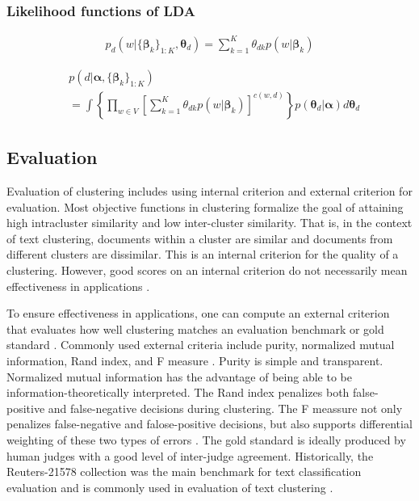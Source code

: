\documentclass{article}
\begin{document}
\subsubsection{Likelihood functions of LDA}

\begin{align}
  p_d(w | \{\boldsymbol{\beta}_k\}_{1:K}, \boldsymbol{\theta}_d) = \sum_{k = 1}^K \theta_{dk} p(w | \boldsymbol{\beta}_k)
\end{align}

\begin{align}
  & p(d | \boldsymbol{\alpha}, \{\boldsymbol{\beta}_k\}_{1:K}) \\
  & = \int \left\{ \prod_{w \in V} \left[ \sum_{k = 1}^K \theta_{dk} p(w | \boldsymbol{\beta}_k) \right]^{c(w,d)} \right\} p(\boldsymbol{\theta}_d | \boldsymbol{\alpha}) d\boldsymbol{\theta}_d
\end{align}


\subsection{Evaluation}

Evaluation of clustering includes using internal criterion and external criterion for evaluation. Most objective functions in clustering formalize the goal of attaining high intracluster similarity and low inter-cluster similarity. That is, in the context of text clustering, documents within a cluster are similar and documents from different clusters are dissimilar. This is an internal criterion for the quality of a clustering. However, good scores on an internal criterion do not necessarily mean effectiveness in applications \cite{manning2008iir}.

To ensure effectiveness in applications, one can compute an external criterion that evaluates how well clustering matches an evaluation benchmark or gold standard \cite{manning2008iir}. Commonly used external criteria include purity, normalized mutual information, Rand index, and F measure \cite{manning2008iir}. Purity is simple and transparent. Normalized mutual information has the advantage of being able to be information-theoretically interpreted. The Rand index penalizes both false-positive and false-negative decisions during clustering. The F meassure not only penalizes false-negative and falose-positive decisions, but also supports differential weighting of these two types of errors \cite{manning2008iir}. The gold standard is ideally produced by human judges with a good level of inter-judge agreement. Historically, the Reuters-21578 collection was the main benchmark for text classification evaluation and is commonly used in evaluation of text clustering \cite{manning2008iir}.
\end{document}
